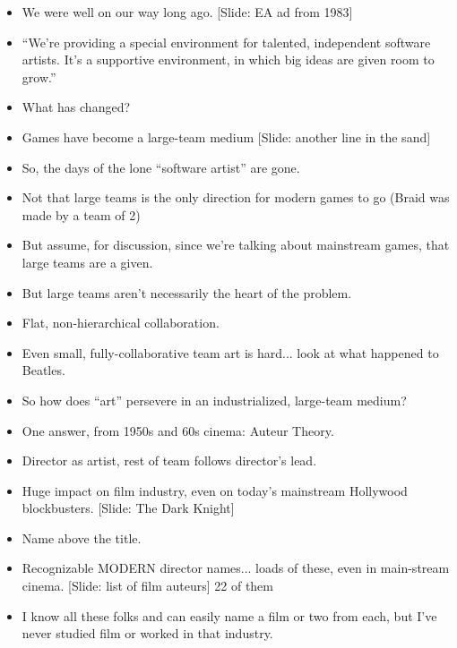 \documentclass[12pt]{article}
\begin{document}
{\begin{itemize}
 
\item We were well on our way long ago.  [Slide:  EA ad from 1983]

\item ``We're providing a special environment for talented, independent software artists. It's a supportive environment, in which big ideas are given room to grow.''

\item What has changed?

\item Games have become a large-team medium [Slide: another line in the sand]

\item So, the days of the lone ``software artist'' are gone.

\item Not that large teams is the only direction for modern games to go (Braid was made by a team of 2)

\item But assume, for discussion, since we're talking about mainstream games, that large teams are a given.

\item But large teams aren't necessarily the heart of the problem.

\item Flat, non-hierarchical collaboration.

\item Even small, fully-collaborative team art is hard... look at what happened to Beatles.

\item So how does ``art'' persevere in an industrialized, large-team medium?

\item One answer, from 1950s and 60s cinema:  Auteur Theory.

\item Director as artist, rest of team follows director's lead.

\item Huge impact on film industry, even on today's mainstream Hollywood blockbusters. [Slide:  The Dark Knight]

\item Name above the title.  

\item Recognizable MODERN director names... loads of these, even in main-stream cinema.  [Slide:  list of film auteurs]  22 of them 

\item I know all these folks and can easily name a film or two from each, but I've never studied film or worked in that industry.


\end{itemize}}
\end{document}
